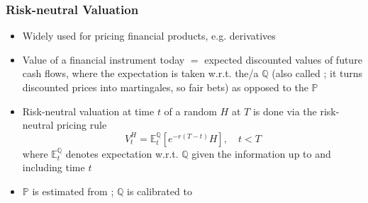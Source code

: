 \subsubsection*{Risk-neutral Valuation}
\begin{itemize}[leftmargin=*]
    \item Widely used for pricing financial products, e.g. derivatives
    \item Value of a financial instrument today $=$ expected discounted values of future cash flows, where the expectation is taken w.r.t. the/a  $\mathbb{Q}$ (also called ; it turns discounted prices into martingales, so fair bets) as opposed to the  $\mathbb{P}$
    \item Risk-neutral valuation at time $t$ of a random  $H$ at $T$ is done via the risk-neutral pricing rule
$$
V_{t}^{H}=\mathbb{E}_{t}^{\mathbb{Q}}\left[e^{-r(T-t)} H\right], \quad t<T
$$
where $\mathbb{E}_{t}^{\mathbb{Q}}$ denotes expectation w.r.t. $\mathbb{Q}$ given the information up to and including time $t$
    \item $\mathbb{P}$ is estimated from ; $\mathbb{Q}$ is calibrated to 
\end{itemize}







